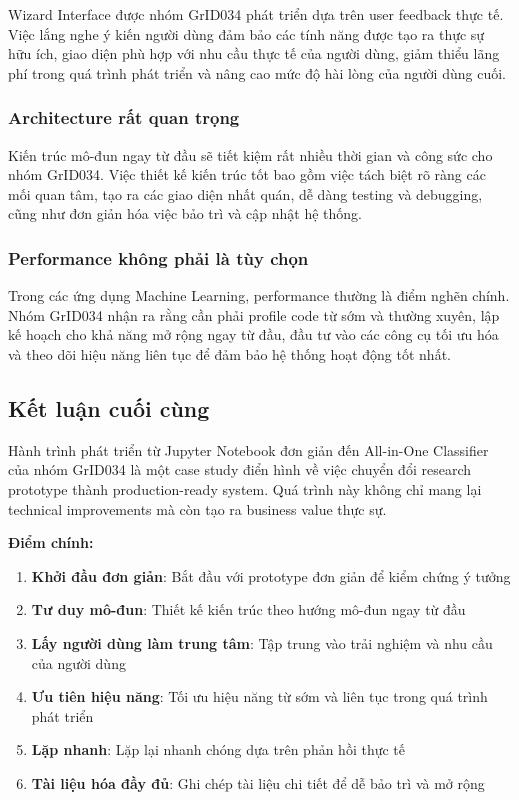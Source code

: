 Wizard Interface được nhóm GrID034 phát triển dựa trên user feedback thực tế. Việc lắng nghe ý kiến người dùng đảm bảo các tính năng được tạo ra thực sự hữu ích, giao diện phù hợp với nhu cầu thực tế của người dùng, giảm thiểu lãng phí trong quá trình phát triển và nâng cao mức độ hài lòng của người dùng cuối.

\subsubsection{Architecture rất quan trọng}

Kiến trúc mô-đun ngay từ đầu sẽ tiết kiệm rất nhiều thời gian và công sức cho nhóm GrID034. Việc thiết kế kiến trúc tốt bao gồm việc tách biệt rõ ràng các mối quan tâm, tạo ra các giao diện nhất quán, dễ dàng testing và debugging, cũng như đơn giản hóa việc bảo trì và cập nhật hệ thống.

\subsubsection{Performance không phải là tùy chọn}

Trong các ứng dụng Machine Learning, performance thường là điểm nghẽn chính. Nhóm GrID034 nhận ra rằng cần phải profile code từ sớm và thường xuyên, lập kế hoạch cho khả năng mở rộng ngay từ đầu, đầu tư vào các công cụ tối ưu hóa và theo dõi hiệu năng liên tục để đảm bảo hệ thống hoạt động tốt nhất.

\subsection{Kết luận cuối cùng}

Hành trình phát triển từ Jupyter Notebook đơn giản đến All-in-One Classifier của nhóm GrID034 là một case study điển hình về việc chuyển đổi research prototype thành production-ready system. Quá trình này không chỉ mang lại technical improvements mà còn tạo ra business value thực sự.

\textbf{Điểm chính:}
\begin{enumerate}
    \item \textbf{Khởi đầu đơn giản}: Bắt đầu với prototype đơn giản để kiểm chứng ý tưởng
    \item \textbf{Tư duy mô-đun}: Thiết kế kiến trúc theo hướng mô-đun ngay từ đầu
    \item \textbf{Lấy người dùng làm trung tâm}: Tập trung vào trải nghiệm và nhu cầu của người dùng
    \item \textbf{Ưu tiên hiệu năng}: Tối ưu hiệu năng từ sớm và liên tục trong quá trình phát triển
    \item \textbf{Lặp nhanh}: Lặp lại nhanh chóng dựa trên phản hồi thực tế
    \item \textbf{Tài liệu hóa đầy đủ}: Ghi chép tài liệu chi tiết để dễ bảo trì và mở rộng
\end{enumerate}

